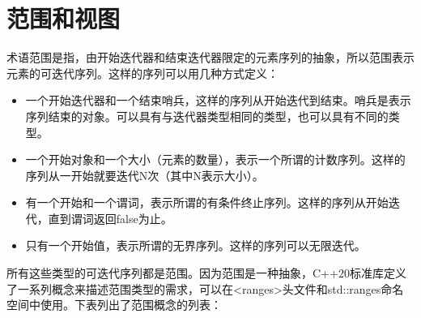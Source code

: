\section{范围和视图}

术语范围是指，由开始迭代器和结束迭代器限定的元素序列的抽象，所以范围表示元素的可迭代序列。这样的序列可以用几种方式定义：

\begin{itemize}
\item
一个开始迭代器和一个结束哨兵，这样的序列从开始迭代到结束。哨兵是表示序列结束的对象。可以具有与迭代器类型相同的类型，也可以具有不同的类型。

\item
一个开始对象和一个大小（元素的数量），表示一个所谓的计数序列。这样的序列从一开始就要迭代N次（其中N表示大小）。

\item
有一个开始和一个谓词，表示所谓的有条件终止序列。这样的序列从开始迭代，直到谓词返回false为止。

\item
只有一个开始值，表示所谓的无界序列。这样的序列可以无限迭代。
\end{itemize}

所有这些类型的可迭代序列都是范围。因为范围是一种抽象，C++20标准库定义了一系列概念来描述范围类型的需求，可以在<ranges>头文件和std::ranges命名空间中使用。下表列出了范围概念的列表：

